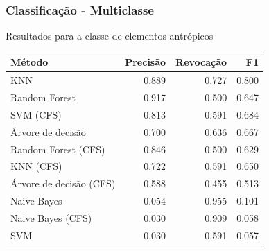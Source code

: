 \documentclass[t]{beamer}
\begin{document}
\begin{frame}[c]
	\frametitle{Classificação - Multiclasse}

	\centering
	Resultados para a classe de elementos antrópicos

	\small{
		\begin{table}[h]
		\centering
		\begin{tabulary}{\linewidth}{|L|R|R|R|}
		\hline
		\textbf{Método} & \textbf{Precisão} & \textbf{Revocação} & \textbf{F1} \\ \hline
		KNN                     & 0.889 & 0.727 & 0.800 \\ \hline
		Random Forest           & 0.917 & 0.500 & 0.647 \\ \hline
		SVM (CFS)               & 0.813 & 0.591 & 0.684 \\ \hline
		Árvore de decisão       & 0.700 & 0.636 & 0.667 \\ \hline
		Random Forest (CFS)     & 0.846 & 0.500 & 0.629 \\ \hline
		KNN (CFS)               & 0.722 & 0.591 & 0.650 \\ \hline
		Árvore de decisão (CFS) & 0.588 & 0.455 & 0.513 \\ \hline
		Naive Bayes             & 0.054 & 0.955 & 0.101 \\ \hline
		Naive Bayes (CFS)       & 0.030 & 0.909 & 0.058 \\ \hline
		SVM                     & 0.030 & 0.591 & 0.057 \\ \hline
		\end{tabulary}
		\end{table}
	}
\end{frame}
\end{document}
